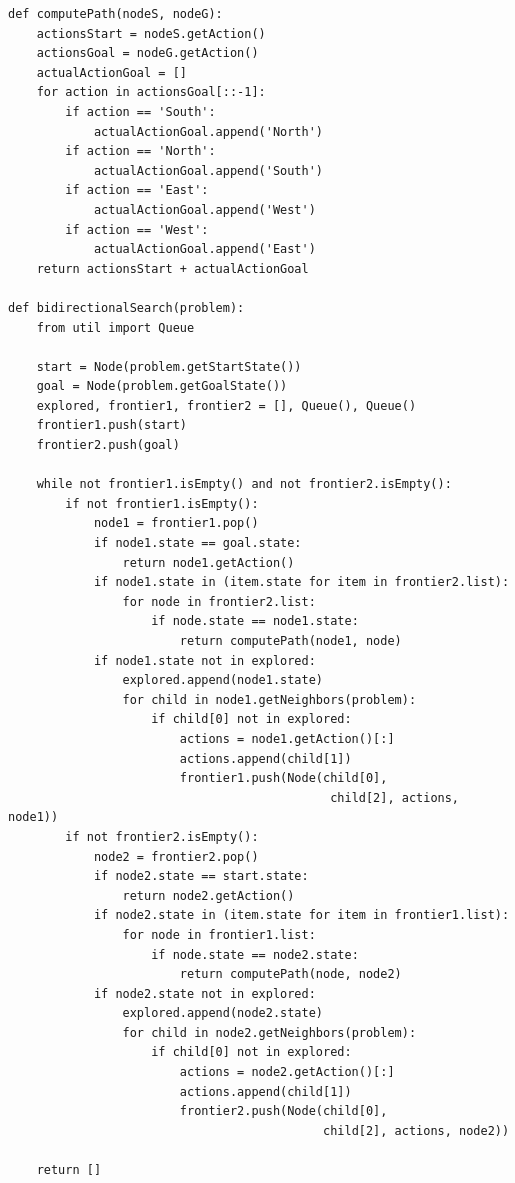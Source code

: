\documentclass[a4paper,12pt]{report}
\begin{document}
\begin{Verbatim}[frame=single]
def computePath(nodeS, nodeG):
    actionsStart = nodeS.getAction()
    actionsGoal = nodeG.getAction()
    actualActionGoal = []
    for action in actionsGoal[::-1]:
        if action == 'South':
            actualActionGoal.append('North')
        if action == 'North':
            actualActionGoal.append('South')
        if action == 'East':
            actualActionGoal.append('West')
        if action == 'West':
            actualActionGoal.append('East')
    return actionsStart + actualActionGoal

def bidirectionalSearch(problem):
    from util import Queue

    start = Node(problem.getStartState())
    goal = Node(problem.getGoalState())
    explored, frontier1, frontier2 = [], Queue(), Queue()
    frontier1.push(start)
    frontier2.push(goal)

    while not frontier1.isEmpty() and not frontier2.isEmpty():
        if not frontier1.isEmpty():
            node1 = frontier1.pop()
            if node1.state == goal.state:
                return node1.getAction()
            if node1.state in (item.state for item in frontier2.list):
                for node in frontier2.list:
                    if node.state == node1.state:
                        return computePath(node1, node)
            if node1.state not in explored:
                explored.append(node1.state)
                for child in node1.getNeighbors(problem):
                    if child[0] not in explored:
                        actions = node1.getAction()[:]
                        actions.append(child[1])
                        frontier1.push(Node(child[0], 
                                             child[2], actions, node1))
        if not frontier2.isEmpty():
            node2 = frontier2.pop()
            if node2.state == start.state:
                return node2.getAction()
            if node2.state in (item.state for item in frontier1.list):
                for node in frontier1.list:
                    if node.state == node2.state:
                        return computePath(node, node2)
            if node2.state not in explored:
                explored.append(node2.state)
                for child in node2.getNeighbors(problem):
                    if child[0] not in explored:
                        actions = node2.getAction()[:]
                        actions.append(child[1])
                        frontier2.push(Node(child[0],
                                            child[2], actions, node2))

    return []
\end{Verbatim}
\end{document}
